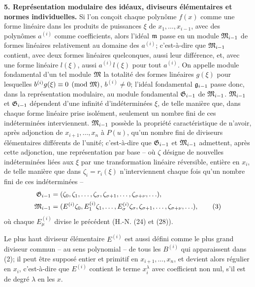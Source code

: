 \textbf{5. Représentation modulaire des idéaux, diviseurs élémentaires et normes individuelles.} Si l'on conçoit chaque polynôme $f(x)$ comme une forme linéaire dans les produits de puissances $\xi$ de $x_1,\ldots,x_{i-1}$, avec des polynômes $a^{(i)}$ comme coefficients, alors l'idéal $\mathfrak m$ passe en un module $\mathfrak M_{i-1}$ de formes linéaires relativement au domaine des $a^{(i)}$; c'est-à-dire que $\mathfrak M_{i-1}$ contient, avec deux formes linéaires quelconques, aussi leur différence, et, avec une forme linéaire $l(\xi)$, aussi $a^{(i)}l(\xi)$ pour tout $a^{(i)}$. On appelle module fondamental d'un tel module $\mathfrak M$ la totalité des formes linéaires $g(\xi)$ pour lesquelles $b^{(i)}g(\xi)\equiv0\pmod{\mathfrak M}$, $b^{(i)}\ne0$; l'idéal fondamental $\mathfrak g_{i-1}$ passe donc, dans la représentation modulaire, au module fondamental $\mathfrak G_{i-1}$ de $\mathfrak M_{i-1}$. $\mathfrak M_{i-1}$ et $\mathfrak G_{i-1}$ dépendent d'une infinité d'indéterminées $\xi$, de telle manière que, dans chaque forme linéaire prise isolément, seulement un nombre fini de ces indéterminées interviennent. $\mathfrak M_{i-1}$ possède la propriété caractéristique de n'avoir, après adjonction de $x_{i+1},\ldots,x_n$ à $P(u)$, qu'un nombre fini de diviseurs élémentaires différents de l'unité; c'est-à-dire que $\mathfrak G_{i-1}$ et $\mathfrak M_{i-1}$ admettent, après cette adjonction, une représentation par base -- où $\zeta$ désigne de nouvelles indéterminées liées aux $\xi$ par une transformation linéaire réversible, entière en $x_i$, de telle manière que dans $\zeta_i=r_i(\xi)$ n'interviennent chaque fois qu'un nombre fini de ces indéterminées --
\begin{align}
\mathfrak G_{i-1}&=(\zeta_0,\zeta_1,\ldots,\zeta_\sigma,\zeta_{\sigma+1},\ldots,\zeta_{\sigma+\nu},\ldots), \notag\\
\mathfrak M_{i-1}&=(E^{(i)}\zeta_0,E_1^{(i)}\zeta_1,\ldots,E_\sigma^{(i)}\zeta_\sigma,
\zeta_{\sigma+1},\ldots,\zeta_{\sigma+\nu},\ldots), \tag{3}
\end{align}
où chaque $E_\mu^{(i)}$ divise le précédent (H.-N. (24) et (28)).

Le plus haut diviseur élémentaire $E^{(i)}$ est aussi défini comme le plus grand diviseur commun -- au sens polynomial -- de tous les $B^{(i)}$ qui apparaissent dans (2); il peut être supposé entier et primitif en $x_{i+1},\ldots,x_n$, et devient alors régulier en $x_i$, c'est-à-dire que $E^{(i)}$ contient le terme $x_i^\lambda$ avec coefficient non nul, s'il est de degré $\lambda$ en les $x$.

